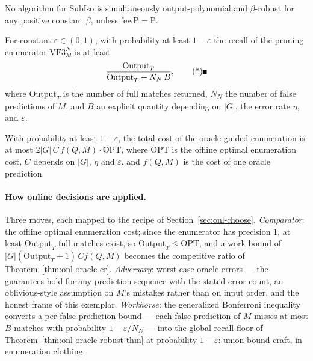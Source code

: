 \begin{theorem}
\label{thm:onl-oracle-barrier}
No algorithm for SubIso is simultaneously output-polynomial and $\beta$-robust
for any positive constant $\beta$, unless $\mathrm{fewP} = \mathrm{P}$. \eop
\end{theorem}

\begin{theorem}\label{thm:onl-oracle-robust-thm}
For constant $\varepsilon \in (0,1)$, with probability at least $1-\varepsilon$
the recall of the pruning enumerator $\mathrm{VF3}_M^N$ is at least
\[
\frac{\mathrm{Output}_T}{\mathrm{Output}_T + N_N\,B}, \eopm
\]
where $\mathrm{Output}_T$ is the number of full matches returned, $N_N$ the
number of false predictions of $M$, and $B$ an explicit quantity depending on
$|G|$, the error rate $\eta$, and $\varepsilon$.
\end{theorem}

\begin{theorem}\label{thm:onl-oracle-cr}
With probability at least $1-\varepsilon$, the total cost of the oracle-guided
enumeration is at most $2|G|\,C\,f(Q,M)\cdot\mathrm{OPT}$, where $\mathrm{OPT}$
is the offline optimal enumeration cost, $C$ depends on $|G|$, $\eta$ and
$\varepsilon$, and $f(Q,M)$ is the cost of one oracle prediction. \eop
\end{theorem}

\paragraph{How online decisions are applied.}
Three moves, each mapped to the recipe of Section~\ref{sec:onl-choose}.
\emph{Comparator}: the offline optimal enumeration cost; since the enumerator
has precision $1$, at least $\mathrm{Output}_T$ full matches exist, so
$\mathrm{Output}_T \le \mathrm{OPT}$, and a work bound of
$|G|(\mathrm{Output}_T+1)\,C f(Q,M)$ becomes the competitive ratio of
Theorem~\ref{thm:onl-oracle-cr}. \emph{Adversary}: worst-case oracle errors ---
the guarantees hold for any prediction sequence with the stated error count, an
oblivious-style assumption on $M$'s mistakes rather than on input order, and
the honest frame of this exemplar. \emph{Workhorse}: the generalized Bonferroni
inequality converts a per-false-prediction bound --- each false prediction of
$M$ misses at most $B$ matches with probability $1 - \varepsilon/N_N$ --- into
the global recall floor of Theorem~\ref{thm:onl-oracle-robust-thm} at
probability $1-\varepsilon$: union-bound craft, in enumeration clothing.

